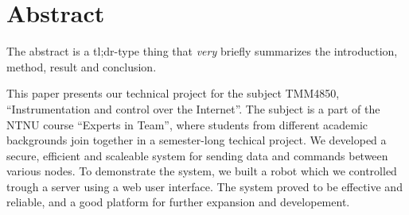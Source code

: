 \chapter{Abstract}
The abstract is a tl;dr-type thing that \textit{very} briefly summarizes the introduction, method, result and conclusion.

This paper presents our technical project for the subject TMM4850, ``Instrumentation and control over the Internet''.
The subject is a part of the NTNU course ``Experts in Team'', where students from different academic backgrounds join together in a semester-long techical project.
We developed a secure, efficient and scaleable system for sending data and commands between various nodes. 
To demonstrate the system, we built a robot which we controlled trough a server using a web user interface.
The system proved to be effective and reliable, and a good platform for further expansion and developement.

